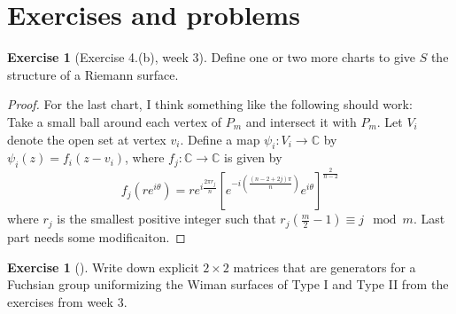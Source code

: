 \documentclass[reqno]{amsart}
\theoremstyle{definition}
\newtheorem{exercise}[theorem]{Exercise}
\theoremstyle{remark}
\begin{document}
\section{Exercises and problems}

\begin{exercise}[Exercise 4.(b), week 3]
    Define one or two more charts to give $S$ the structure of a Riemann
        surface.
\end{exercise}

\begin{proof}
    For the last chart, I think something like the following should work:\\
    Take a small ball around each vertex of $P_m$ and intersect it
        with $P_m$. Let $V_i$ denote the open set at vertex $v_i$.
        Define a map $\psi_i \colon V_i \to \mathbb{C}$ by
        $\psi_i (z) = f_i \left( z - v_i \right) $, where
        $f_j \colon \mathbb{C} \to \mathbb{C}$ is given by
        \[
        f_j(re^{i \theta} ) = r e^{i \frac{2 \pi r_j}{n}} \left[ 
        e^{- i \left( \frac{(n-2 + 2j)\pi}{n} \right) } e^{i \theta}\right]^{\frac{2}{n-2}}
        \] 
        where $r_j$ is the smallest positive integer such that
        $r_j \left( \frac{m}{2}-1 \right) \equiv j \mod{m} $. Last part needs some modificaiton.
\end{proof}

\begin{exercise}[]\label{fuchsian-group-for-wiman-surfaces}
        Write down explicit $2 \times 2$ matrices that are generators for
        a Fuchsian group uniformizing the Wiman surfaces of Type I and Type
        II from the exercises from week 3.
    \end{exercise}
\end{document}
